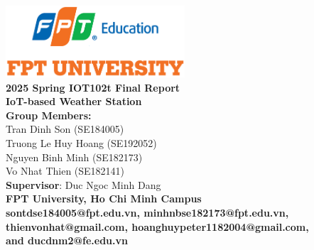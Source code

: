 \documentclass[conference, onecolumn]{IEEEtran}
\begin{document}
\pagestyle{plain}

\begin{titlepage}

    \begin{center}
        \includegraphics[width=0.5\textwidth]{figures/FPTU_logo.png}\\[1cm]

        {\LARGE \textbf{2025 Spring IOT102t Final Report}}\\[0.5cm]
        
        {\LARGE \textbf{IoT-based Weather Station}}\\[1cm]
        
        \textbf{Group Members:}\\
        Tran Dinh Son (SE184005)\\
        Truong Le Huy Hoang (SE192052)\\
        Nguyen Binh Minh (SE182173)\\
        Vo Nhat Thien (SE182141)\\
        
        \textbf{Supervisor}: Duc Ngoc Minh Dang\\[0.5cm]
        
        \textbf{FPT University, Ho Chi Minh Campus}\\
        
        \textbf{sontdse184005@fpt.edu.vn, minhnbse182173@fpt.edu.vn,}\\
        \textbf{thienvonhat@gmail.com, hoanghuypeter1182004@gmail.com,}\\
        \textbf{and ducdnm2@fe.edu.vn}\\[2cm]
        
    \end{center}


\end{titlepage}
\end{document}
